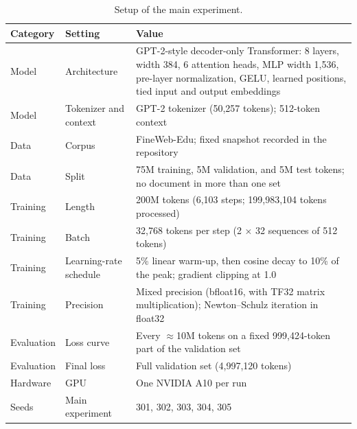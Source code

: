 \begin{table}[t]
\caption{Setup of the main experiment.}
\label{tab:experimental-protocol}
\centering
\small
\begin{tabular}{p{} p{} p{}}
\hline
Category & Setting & Value \\
\hline
Model & Architecture & GPT-2-style decoder-only Transformer: 8 layers, width 384, 6 attention heads, MLP width 1,536, pre-layer normalization, GELU, learned positions, tied input and output embeddings \\
Model & Tokenizer and context & GPT-2 tokenizer (50,257 tokens); 512-token context \\
Data & Corpus & FineWeb-Edu; fixed snapshot recorded in the repository \\
Data & Split & 75M training, 5M validation, and 5M test tokens; no document in more than one set \\
Training & Length & 200M tokens (6,103 steps; 199,983,104 tokens processed) \\
Training & Batch & 32,768 tokens per step (2 $\times$ 32 sequences of 512 tokens) \\
Training & Learning-rate schedule & 5\% linear warm-up, then cosine decay to 10\% of the peak; gradient clipping at 1.0 \\
Training & Precision & Mixed precision (bfloat16, with TF32 matrix multiplication); Newton--Schulz iteration in float32 \\
Evaluation & Loss curve & Every $\approx$10M tokens on a fixed 999,424-token part of the validation set \\
Evaluation & Final loss & Full validation set (4,997,120 tokens) \\
Hardware & GPU & One NVIDIA A10 per run \\
Seeds & Main experiment & 301, 302, 303, 304, 305 \\
\hline
\end{tabular}
\end{table}
